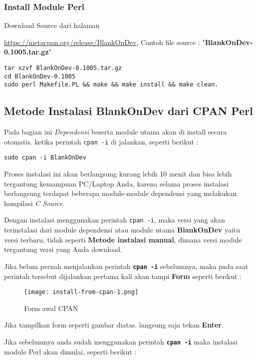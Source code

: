\subsubsection{Install Module Perl}
\noindent
Download Source dari halaman {\url{https://metacpan.org/release/BlankOnDev}, 
Contoh file source : "\textbf{BlankOnDev-0.1005.tar.gz}"

\begin{lstlisting}[language=ShellBash]
tar xzvf BlankOnDev-0.1005.tar.gz
cd BlankOnDev-0.1005
sudo perl Makefile.PL && make && make install && make clean.
\end{lstlisting}

\subsection{Metode Instalasi BlankOnDev dari CPAN Perl}
\noindent
Pada bagian ini \textit{Dependensi} beserta module utama akan di install secara otomatis. ketika perintah \texttt{cpan -i} di jalankan, seperti berikut :

\begin{lstlisting}[language=ShellBash]
sudo cpan -i BlankOnDev
\end{lstlisting}

\noindent
Proses instalasi ini akan berlangsung kurang lebih 10 menit dan bisa lebih tergantung kemampuan PC/Laptop Anda, karena selama proses instalasi berlangsung terdapat beberapa module-module dependensi yang melakukan kompilasi \textit{C Source}. 

\noindent
Dengan instalasi menggunakan perintah \texttt{cpan -i}, maka versi yang akan terinstalasi dari module dependensi atau module utama \textbf{BlankOnDev} yaitu versi terbaru, tidak seperti \textbf{Metode instalasi manual}, dimana versi module tergantung versi yang Anda download.

\noindent
Jika belum pernah menjalankan perintah \textbf{\texttt{cpan -i}} sebelumnya, maka pada saat perintah tersebut dijalankan pertama kali akan tampi \textbf{Form} seperti berikut :

\begin{figure}[H]
	\centering
	\texttt{[image: install-from-cpan-1.png]}
	\caption{Form awal CPAN}
	\label{fig:bab2_form_awal_cpan}
\end{figure}

\noindent
Jika tampilkan form seperti gambar diatas, langsung saja tekan \textbf{Enter}.

\noindent
Jika sebelumnya anda sudah menggunakan perintah \textbf{\texttt{cpan -i}} maka instalasi module Perl akan dimulai, seperti berikut :

}

